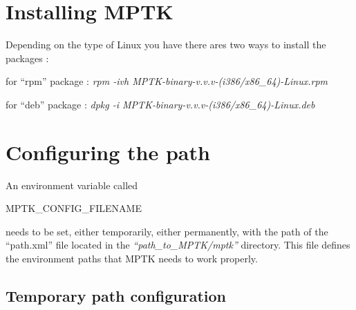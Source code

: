 \section{Installing MPTK}

Depending on the type of Linux you have there ares two ways to install the packages : 
\begin{my_itemize}
	\item for ``rpm'' package : \textcolor[rgb]{0.4,0.4,0.4}{\emph{rpm -ivh MPTK-binary-v.v.v-(i386/x86\_64)-Linux.rpm}}
	\item for ``deb'' package : \textcolor[rgb]{0.4,0.4,0.4}{\emph{dpkg -i MPTK-binary-v.v.v-(i386/x86\_64)-Linux.deb}}
\end{my_itemize}
\section{Configuring the path}

An environment variable called \begin{footnotesize}MPTK\_CONFIG\_FILENAME\end{footnotesize} needs to be set, either 
temporarily, either permanently, with the path of the ``path.xml'' file located in the \emph{``path\_to\_MPTK/mptk''} directory. This 
file defines the environment paths that MPTK needs to work properly.


\subsection{Temporary path configuration}
	
